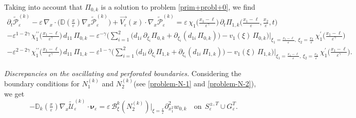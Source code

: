 \documentclass[reqno]{amsart}            %
\numberwithin{equation}{section}
\begin{document}
	Taking into account that $\Pi_{0,k}$ is a solution to problem \eqref{prim+probl+0}, we find 
	\begin{multline*}%
		\partial_t \widetilde{\mathcal{P}}^{(k)}_\varepsilon
		-  \varepsilon\, \nabla_x \cdot\big( \mathbb{D}(\tfrac{x}{\varepsilon}) \nabla_x \widetilde{\mathcal{P}}^{(k)}_\varepsilon \big) +
		\overrightarrow{V_\varepsilon}(x) \cdot \nabla_x \widetilde{\mathcal{P}}^{(k)}_\varepsilon  =  \varepsilon\, \chi_{1}\big(\tfrac{x_1 -\ell}{\varepsilon^\gamma}\big)\, \partial_t\Pi_{1,k}\big(\tfrac{x_1- \ell}{\varepsilon}, \tfrac{x_2}{\varepsilon}, t\big) 
		\\
		- \varepsilon^{1-2\gamma}\,  \chi^{\prime\prime}_{1}\big(\tfrac{x_1 -\ell}{\varepsilon^\gamma}\big) \, d_{11} \, \Pi_{0,k}  
		- \varepsilon^{-\gamma} \bigg(\sum_{i=1}^{2} \big(d_{1 i}\, \partial_{\xi_i}\Pi_{0,k} +
		\partial_{\xi_i}(d_{1 i} \, \Pi_{0,k})\big) - v_{1}(\xi)\, \Pi_{0,k}\bigg)\Big|_{\xi_1=\frac{x_1 - \ell}{\varepsilon}, \ \xi_2=\frac{x_2}{\varepsilon}}\, \chi^{\prime}_{1}\big(\tfrac{x_1 -\ell}{\varepsilon^\gamma}\big)
		\\
		- \varepsilon^{2-2\gamma}\,  \chi^{\prime\prime}_{1}\big(\tfrac{x_1 -\ell}{\varepsilon^\gamma}\big) \, d_{11} \, \Pi_{1,k}  
		- \varepsilon^{1-\gamma} \bigg(\sum_{i=1}^{2} \big(d_{1 i}\, \partial_{\xi_i}\Pi_{1,k} +
		\partial_{\xi_i}(d_{1 i} \, \Pi_{1,k})\big) - v_{1}(\xi)\, \Pi_{1,k}\bigg)\Big|_{\xi_1=\frac{x_1 - \ell}{\varepsilon}, \ \xi_2=\frac{x_2}{\varepsilon}}\, \chi^{\prime}_{1}\big(\tfrac{x_1 -\ell}{\varepsilon^\gamma}\big).
	\end{multline*}
	
	
	\textit{Discrepancies on the oscillating and perforated boundaries.} Considering the boundary conditions for $N^{(k)}_1$ and $N^{(k)}_2$(see \eqref{problem-N-1} and \eqref{problem-N-2}), we get
	\begin{equation}\label{eq-5-6}
		-  \mathbb{D}_k(\tfrac{x}{\varepsilon})\nabla_x \widetilde{\mathcal{U}}^{(k)}_\varepsilon  \cdot \boldsymbol{\nu}_\varepsilon  =  \varepsilon \, \mathcal{B}^k_\xi(N^{(k)}_2)\Big|_{\xi=\frac{x}{\varepsilon}} \partial^2_{x_1^2}w_{0,k}  \quad \text{on} \ \ S^{\pm, T}_\varepsilon \cup
		G^{T}_\varepsilon .
	\end{equation}
	
\end{document}
